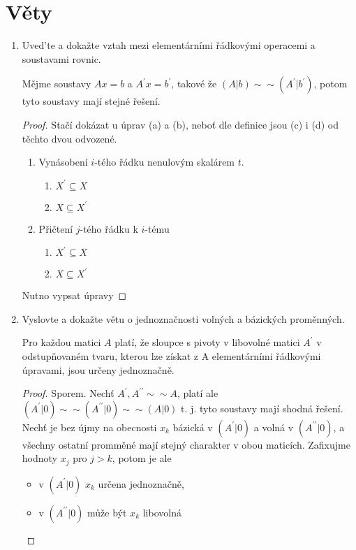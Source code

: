\documentclass[10pt,a4paper]{article}
\begin{document}
\part{Věty}
\begin{enumerate}


\item Uved’te a dokažte vztah mezi elementárními řádkovými operacemi a soustavami rovnic.


Mějme soustavy $Ax = b$ a $A^\prime x = b^\prime$, takové že $(A|b) \sim \sim (A^\prime|b^\prime)$, potom tyto soustavy mají stejné řešení.

\begin{proof}
Stačí dokázat u úprav (a) a (b), neboť dle definice jsou (c) i (d) od těchto dvou odvozené.

\begin{enumerate}
\item Vynásobení $i$-tého řádku nenulovým skalárem $t$.
\begin{enumerate}
\item $X^\prime \subseteq X$
\item $X \subseteq X^\prime$ 
\end{enumerate}

\item Přičtení $j$-tého řádku k $i$-tému
\begin{enumerate}
\item $X^\prime \subseteq X$
\item $X \subseteq X^\prime$ 
\end{enumerate}

\end{enumerate}

Nutno vypsat úpravy

\end{proof}

\item Vyslovte a dokažte větu o jednoznačnosti volných a bázických proměnných.

Pro každou matici $A$ platí, že sloupce s pivoty v libovolné matici $A^\prime$ v odstupňovaném tvaru, kterou lze získat z A elementárními řádkovými úpravami, jsou určeny jednoznačně.

\begin{proof}
Sporem. Nechť $A^\prime, A^{\prime\prime} \sim \sim A$, platí ale $(A^\prime|0) \sim \sim(A^{\prime\prime}|0) \sim \sim (A|0)$ t. j. tyto soustavy mají shodná řešení. Nechť je bez újmy na obecnosti $x_k$ bázická v $(A^\prime|0)$ a volná v $(A^{\prime \prime}|0)$, a všechny ostatní promměné mají stejný charakter v obou maticích.
Zafixujme hodnoty $x_j$ pro $j > k$, potom je ale \begin{itemize}
\item v $(A^\prime|0)$ $x_k$ určena jednoznačně,
\item v $(A^{\prime \prime}|0)$ může být $x_k$ libovolná
\end{itemize} 


\end{proof}
\end{enumerate}
\end{document}
